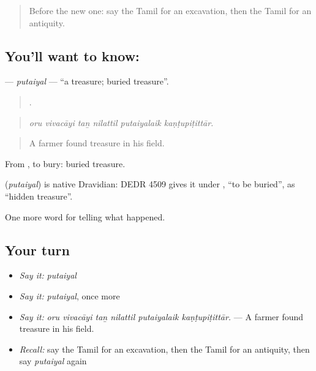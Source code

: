 \label{lesson:TA-C341-putaiyal}



\begin{quote}
Before the new one: say the Tamil for an excavation, then the Tamil for an antiquity.
\end{quote}

\subsection*{You'll want to know: }
\textbf{} — \emph{putaiyal} — \textquotedblleft{}a treasure; buried treasure\textquotedblright{}.

\begin{quote}
     .
\end{quote}

\begin{quote}
\emph{oru vivacāyi taṉ nilattil putaiyalaik kaṇṭupiṭittār.}
\end{quote}

\begin{quote}
A farmer found treasure in his field.
\end{quote}

From , to bury: buried treasure.

\begin{cousinweb}
\textbf{} (\emph{putaiyal}) is native Dravidian: DEDR 4509 gives it under , \textquotedblleft{}to be buried\textquotedblright{}, as \textquotedblleft{}hidden treasure\textquotedblright{}.
\end{cousinweb}

\begin{grammarlens}[title={What you've built}]
One more word for telling what happened.
\end{grammarlens}

\subsection*{Your turn}
\begin{itemize}
\raggedright
  \item \emph{Say it:} \emph{putaiyal}
  \item \emph{Say it:} \emph{putaiyal}, once more
  \item \emph{Say it:} \emph{oru vivacāyi taṉ nilattil putaiyalaik kaṇṭupiṭittār.} — A farmer found treasure in his field.
  \item \emph{Recall:} say the Tamil for an excavation, then the Tamil for an antiquity, then say \emph{putaiyal} again
\end{itemize}

